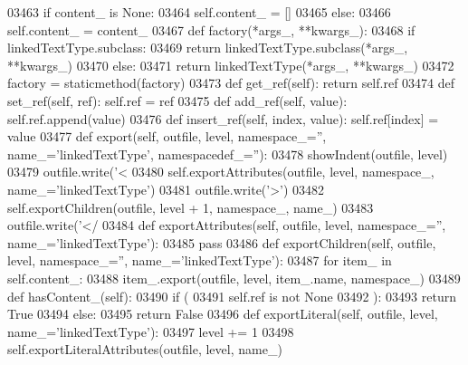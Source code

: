\begin{DoxyCode}
{{{{{{{{{{{{{{{{{{{{{{{{{{{{{{{{{{{{{{{{{{{{{{{{{{{{{{{{{{{{{{{{{{{{{{{{{{{{{{{{{{{{{{{{{{{{{{{{{{{{{{{{{{{{{{{{{{{{{{{{{{{{{{{{{{{{{{{{{{{{{{{{{{{{{{{{{{{{{{{{{{{{{{{{{{{{{{{{{{{{{{{{{{{{{{{{{{{{{{{{{{{{{{{{{{{{{{{{{{{{{{{{{{{{03463         \textcolor{keywordflow}{if} content\_ \textcolor{keywordflow}{is} \textcolor{keywordtype}{None}:
03464             self.content_ = []
03465         \textcolor{keywordflow}{else}:
03466             self.content_ = content\_
03467     \textcolor{keyword}{def }factory(*args\_, **kwargs\_):
03468         \textcolor{keywordflow}{if} linkedTextType.subclass:
03469             \textcolor{keywordflow}{return} linkedTextType.subclass(*args\_, **kwargs\_)
03470         \textcolor{keywordflow}{else}:
03471             \textcolor{keywordflow}{return} linkedTextType(*args\_, **kwargs\_)
03472     factory = staticmethod(factory)
03473     \textcolor{keyword}{def }get_ref(self): \textcolor{keywordflow}{return} self.ref
03474     \textcolor{keyword}{def }set_ref(self, ref): self.ref = ref
03475     \textcolor{keyword}{def }add_ref(self, value): self.ref.append(value)
03476     \textcolor{keyword}{def }insert_ref(self, index, value): self.ref[index] = value
03477     \textcolor{keyword}{def }export(self, outfile, level, namespace\_='', name\_='linkedTextType', namespacedef\_=''):
03478         showIndent(outfile, level)
03479         outfile.write(\textcolor{stringliteral}{'<%
03480         self.exportAttributes(outfile, level, namespace\_, name\_=\textcolor{stringliteral}{'linkedTextType'})
03481         outfile.write(\textcolor{stringliteral}{'>'})
03482         self.exportChildren(outfile, level + 1, namespace\_, name\_)
03483         outfile.write(\textcolor{stringliteral}{'</%
03484     \textcolor{keyword}{def }exportAttributes(self, outfile, level, namespace\_='', name\_='linkedTextType'):
03485         \textcolor{keywordflow}{pass}
03486     \textcolor{keyword}{def }exportChildren(self, outfile, level, namespace\_='', name\_='linkedTextType'):
03487         \textcolor{keywordflow}{for} item\_ \textcolor{keywordflow}{in} self.content\_:
03488             item\_.export(outfile, level, item\_.name, namespace\_)
03489     \textcolor{keyword}{def }hasContent_(self):
03490         \textcolor{keywordflow}{if} (
03491             self.ref \textcolor{keywordflow}{is} \textcolor{keywordflow}{not} \textcolor{keywordtype}{None}
03492             ):
03493             \textcolor{keywordflow}{return} \textcolor{keyword}{True}
03494         \textcolor{keywordflow}{else}:
03495             \textcolor{keywordflow}{return} \textcolor{keyword}{False}
03496     \textcolor{keyword}{def }exportLiteral(self, outfile, level, name\_='linkedTextType'):
03497         level += 1
03498         self.exportLiteralAttributes(outfile, level, name\_)
}}}}}}}}}}}}}}}}}}}}}}}}}}}}}}}}}}}}}}}}}}}}}}}}}}}}}}}}}}}}}}}}}}}}}}}}}}}}}}}}}}}}}}}}}}}}}}}}}}}}}}}}}}}}}}}}}}}}}}}}}}}}}}}}}}}}}}}}}}}}}}}}}}}}}}}}}}}}}}}}}}}}}}}}}}}}}}}}}}}}}}}}}}}}}}}}}}}}}}}}}}}}}}}}}}}}}}}}}}}}}}}}}}}}}}
\end{DoxyCode}
